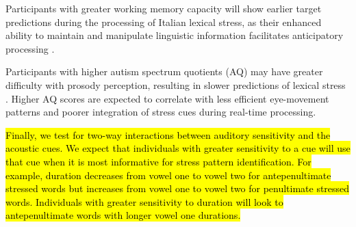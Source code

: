 Participants with greater working memory capacity will show earlier target predictions during the processing of Italian lexical stress, as their enhanced ability to maintain and manipulate linguistic information facilitates anticipatory processing \citep{Traxler2009, Huettig2016}.

Participants with higher autism spectrum quotients (AQ) may have greater difficulty with prosody perception, resulting in slower predictions of lexical stress \citep{schelinski2020speech, grossman2023relationship}. Higher AQ scores are expected to correlate with less efficient eye-movement patterns and poorer integration of stress cues during real-time processing.

\hl{Finally, we test for two-way interactions between auditory sensitivity and the acoustic cues. We expect that individuals with greater sensitivity to a cue will use that cue when it is most informative for stress pattern identification. For example, duration decreases from vowel one to vowel two for antepenultimate stressed words but increases from vowel one to vowel two for penultimate stressed words. Individuals with greater sensitivity to duration will look to antepenultimate words with longer vowel one durations. 
}

